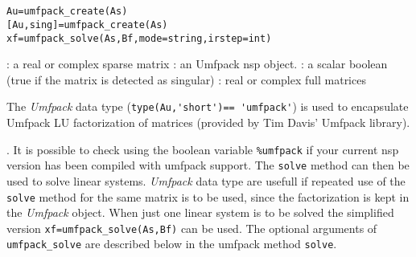 
\begin{mandesc}
  \\
  \\
\end{mandesc}

\begin{calling_sequence}
\begin{verbatim}
Au=umfpack_create(As)
[Au,sing]=umfpack_create(As)
xf=umfpack_solve(As,Bf,mode=string,irstep=int)
\end{verbatim}
\end{calling_sequence}
\begin{parameters}
  \begin{varlist}
    : a real or complex sparse matrix
    : an Umfpack nsp object.
    : a scalar boolean (true if the matrix is detected as singular) 
    : real or complex full matrices 
  \end{varlist}
\end{parameters}

\begin{mandescription}
The \emph{Umfpack} data type (\verb+type(Au,'short')== 'umfpack'+) is used to 
encapsulate Umfpack LU factorization of matrices (provided by Tim Davis' Umfpack library). 
\end{mandescription}. It is possible to check using the boolean variable \verb+%umfpack+ 
if your current nsp version has been compiled with umfpack support. The \verb+solve+ method 
can then be used to solve linear systems. \emph{Umfpack} data type are usefull if 
repeated use of the \verb+solve+ method for the same matrix is to be used, 
since the factorization is kept in the \emph{Umfpack} object. When just one linear 
system is to be solved the simplified version \verb+xf=umfpack_solve(As,Bf)+ can be used. 
The optional arguments of \verb+umfpack_solve+ are described below in the umfpack method
\verb+solve+.

